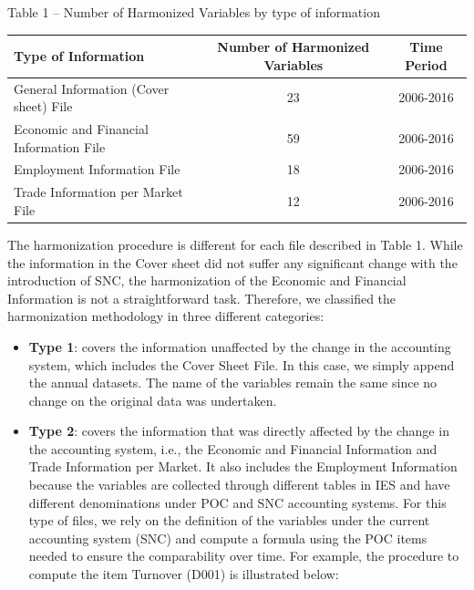 \documentclass[]{book}
\begin{document}
Table 1 -- Number of Harmonized Variables by type of information

\begin{longtable}[]{@{}lcc@{}}
\toprule
Type of Information & Number of Harmonized Variables & Time Period\tabularnewline
\midrule
\endhead
General Information (Cover sheet) File & 23 & 2006-2016\tabularnewline
Economic and Financial Information File & 59 & 2006-2016\tabularnewline
Employment Information File & 18 & 2006-2016\tabularnewline
Trade Information per Market File & 12 & 2006-2016\tabularnewline
\bottomrule
\end{longtable}

The harmonization procedure is different for each file described in Table 1. While the information in the Cover sheet did not suffer any significant change with the introduction of SNC, the harmonization of the Economic and Financial Information is not a straightforward task. Therefore, we classified the harmonization methodology in three different categories:

\begin{itemize}
\item
  \textbf{Type 1}: covers the information unaffected by the change in the accounting system, which includes the Cover Sheet File. In this case, we simply append the annual datasets. The name of the variables remain the same since no change on the original data was undertaken.
\item
  \textbf{Type 2}: covers the information that was directly affected by the change in the accounting system, i.e., the Economic and Financial Information and Trade Information per Market. It also includes the Employment Information because the variables are collected through different tables in IES and have different denominations under POC and SNC accounting systems.
  For this type of files, we rely on the definition of the variables under the current accounting system (SNC) and compute a formula using the POC items needed to ensure the comparability over time.
  For example, the procedure to compute the item Turnover (D001) is illustrated below:
\end{itemize}
\end{document}
